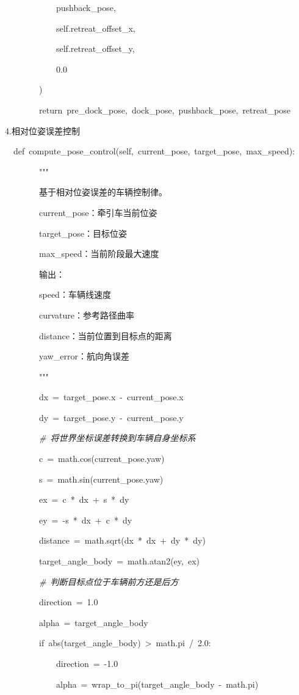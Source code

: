 ~~~~~~~~~~~~pushback\_pose,

~~~~~~~~~~~~self.retreat\_offset\_x,

~~~~~~~~~~~~self.retreat\_offset\_y,

~~~~~~~~~~~~0.0

~~~~~~~~)

~~~~~~~~return~pre\_dock\_pose,~dock\_pose,~pushback\_pose,~retreat\_pose

4.相对位姿误差控制

~~def~compute\_pose\_control(self,~current\_pose,~target\_pose,~max\_speed):

~~~~~~~~"""

~~~~~~~~基于相对位姿误差的车辆控制律。

~~~~~~~~current\_pose：牵引车当前位姿

~~~~~~~~target\_pose：目标位姿

~~~~~~~~max\_speed：当前阶段最大速度

~~~~~~~~输出：

~~~~~~~~speed：车辆线速度

~~~~~~~~curvature：参考路径曲率

~~~~~~~~distance：当前位置到目标点的距离

~~~~~~~~yaw\_error：航向角误差

~~~~~~~~"""

~~~~~~~~dx~=~target\_pose.x~-~current\_pose.x

~~~~~~~~dy~=~target\_pose.y~-~current\_pose.y

~~~~~~~~\emph{\#~将世界坐标误差转换到车辆自身坐标系}

~~~~~~~~c~=~math.cos(current\_pose.yaw)

~~~~~~~~s~=~math.sin(current\_pose.yaw)

~~~~~~~~ex~=~c~*~dx~+~s~*~dy

~~~~~~~~ey~=~-s~*~dx~+~c~*~dy

~~~~~~~~distance~=~math.sqrt(dx~*~dx~+~dy~*~dy)

~~~~~~~~target\_angle\_body~=~math.atan2(ey,~ex)

~~~~~~~~\emph{\#~判断目标点位于车辆前方还是后方}

~~~~~~~~direction~=~1.0

~~~~~~~~alpha~=~target\_angle\_body

~~~~~~~~if~abs(target\_angle\_body)~\textgreater~math.pi~/~2.0:

~~~~~~~~~~~~direction~=~-1.0

~~~~~~~~~~~~alpha~=~wrap\_to\_pi(target\_angle\_body~-~math.pi)

